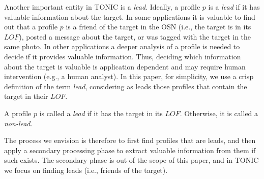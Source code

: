 \documentclass[journal]{IEEEtran}
\begin{document}
Another important entity in TONIC is a {\em lead}. 
Ideally, a profile $p$ is  a {\em lead} if it has valuable information about the target. 
In some applications it is valuable to find out that a profile $p$ is a friend of the target in the OSN (i.e., the target is in its $LOF$), posted a message about the target, or was tagged with the target in the same photo. In other applications a deeper analysis of a profile is needed to decide if it provides valuable information. 
Thus, deciding which information about the target is valuable
is application dependent and may require human intervention (e.g., a human analyst). In this paper, for simplicity, we use a crisp definition of the term {\em lead}, considering as leads those profiles that contain the target in their  \(LOF\).

\begin{definition}
A profile $p$ is called a {\em lead} if it has the target in its \(LOF\). Otherwise, it is called a {\em non-lead}.   
\label{def:lead}
\end{definition}

The process we envision is therefore to first find profiles that are leads, and then apply a secondary processing phase to extract valuable information from them if such exists. The secondary phase is out of the scope of this paper, and in TONIC we focus on finding leads (i.e., friends of the target). 
\end{document}
